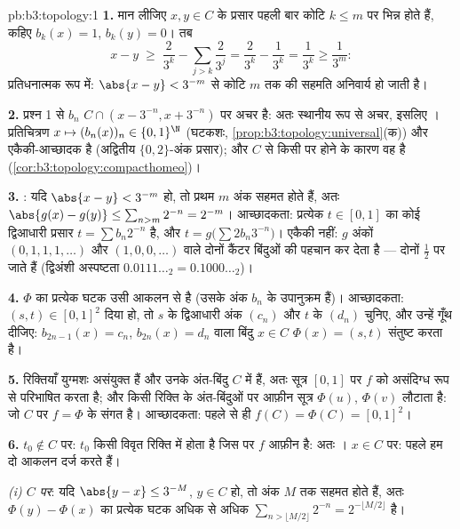 \begin{solution}{pb:b3:topology:1}
\textbf{1.} मान लीजिए $x, y \in C$ के प्रसार पहली बार कोटि $k \leq m$ पर भिन्न
होते हैं, कहिए $b_k(x) = 1$, $b_k(y) = 0$। तब
\[
x - y \;\geq\; \frac{2}{3^k} - \sum_{j > k}\frac{2}{3^j}
= \frac{2}{3^k} - \frac{1}{3^k} = \frac1{3^k} \geq \frac1{3^m}:
\]
प्रतिधनात्मक रूप में: $\abs{x - y} < 3^{-m}$ से कोटि $m$ तक की सहमति अनिवार्य हो
जाती है।

\textbf{2.} प्रश्न 1 से $b_n$ $C \cap (x -
3^{-n}, x + 3^{-n})$ पर अचर है: अतः स्थानीय रूप से
अचर, इसलिए । प्रतिचित्रण $x \mapsto (b_n(x))_n \in \{0,1\}^\N$  (घटकशः, \cref{prop:b3:topology:universal}(क)) और
एकैकी-आच्छादक है (अद्वितीय $\{0,2\}$-अंक प्रसार); और  $C$ से किसी
 पर होने के कारण वह  है (\cref{cor:b3:topology:compacthomeo})।

\textbf{3.} : यदि $\abs{x - y} < 3^{-m}$ हो, तो प्रथम $m$ अंक सहमत होते हैं,
अतः $\abs{g(x) - g(y)} \leq \sum_{n > m}2^{-n}
= 2^{-m}$। आच्छादकता: प्रत्येक $t \in [0,1]$ का कोई द्विआधारी प्रसार $t = \sum b_n2^{-n}$
है, और $t = g\bigl(\sum
2b_n3^{-n}\bigr)$। एकैकी नहीं: $g$ अंकों $(0,1,1,1,\dots)$ और $(1,0,0,\dots)$ वाले दोनों
कैंटर बिंदुओं की पहचान कर देता है --- दोनों $\frac12$ पर जाते हैं
(द्विअंशी अस्पष्टता $0.0111\ldots_2 =
0.1000\ldots_2$)।

\textbf{4.} $\Phi$ का प्रत्येक घटक उसी आकलन से  है (उसके अंक
$b_n$ के उपानुक्रम हैं)। आच्छादकता: $(s, t) \in [0,1]^2$ दिया हो, तो $s$ के
द्विआधारी अंक $(c_n)$ और $t$ के $(d_n)$ चुनिए, और उन्हें गूँथ दीजिए:
$b_{2n-1}(x) = c_n$, $b_{2n}(x) = d_n$ वाला बिंदु $x
\in C$ $\Phi(x) = (s,t)$ संतुष्ट करता है।

\textbf{5.} रिक्तियाँ युग्मशः असंयुक्त हैं और उनके अंत-बिंदु $C$
में हैं, अतः सूत्र $[0,1]$ पर $f$ को असंदिग्ध रूप से परिभाषित करता
है; और किसी रिक्ति के अंत-बिंदुओं पर आफ़ीन सूत्र $\Phi(u)$, $\Phi(v)$ लौटाता
है: जो $C$ पर $f = \Phi$ के संगत है। आच्छादकता: पहले से ही $f(C) = \Phi(C) = [0,1]^2$।

\textbf{6.} $t_0 \notin C$ पर: $t_0$ किसी विवृत रिक्ति में होता है जिस पर
$f$ आफ़ीन है: अतः । $x \in C$ पर: पहले हम दो आकलन दर्ज करते हैं।

\emph{(i) $C$ पर}: यदि $\abs{y - x} \leq 3^{-M}$, $y \in C$ हो, तो अंक $M$ तक सहमत होते
हैं, अतः $\Phi(y)
- \Phi(x)$ का प्रत्येक घटक अधिक से अधिक $\sum_{n > \lfloor M/2\rfloor} 2^{-n} =
2^{-\lfloor M/2\rfloor}$ है।


\end{solution}
